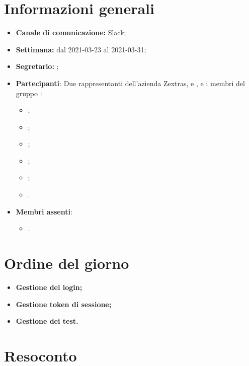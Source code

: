 \section{Informazioni generali}

\begin{itemize}

    \item \textbf{Canale di comunicazione:} Slack;

    \item \textbf{Settimana:} dal 2021-03-23 al 2021-03-31;

    \item \textbf{Segretario:} \ACapoRedazione{};

    \item \textbf{Partecipanti}: Due rappresentanti dell'azienda Zextras, \textit{\Alessio{}} e \textit{\Federico{}}, e i membri del gruppo \Gruppo{}:
        \begin{itemize}
            \item \Daniele{};
            \item \Davide{};
            \item \Francesco{};
            \item \Giosue{};
            \item \Lucrezia{};  
            \item \Matteo{}.
        \end{itemize}
    \item \textbf{Membri assenti}:
        \begin{itemize}
            \item \Tommaso{}.
        \end{itemize}
\end{itemize}

\section{Ordine del giorno}

\begin{itemize}
    \item\textbf{Gestione del login;}
    \item\textbf{Gestione token di sessione;}
    \item\textbf{Gestione dei test.}
\end{itemize}
\newpage


\section{Resoconto}
